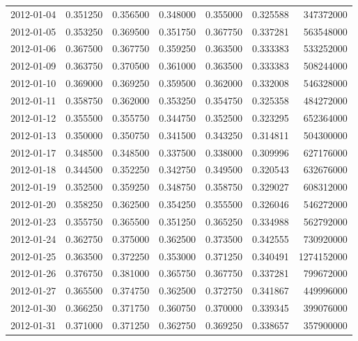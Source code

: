 \begin{tabular}{lrrrrrr}
2012-01-04 &    0.351250 &    0.356500 &    0.348000 &    0.355000 &    0.325588 &   347372000 \\
2012-01-05 &    0.353250 &    0.369500 &    0.351750 &    0.367750 &    0.337281 &   563548000 \\
2012-01-06 &    0.367500 &    0.367750 &    0.359250 &    0.363500 &    0.333383 &   533252000 \\
2012-01-09 &    0.363750 &    0.370500 &    0.361000 &    0.363500 &    0.333383 &   508244000 \\
2012-01-10 &    0.369000 &    0.369250 &    0.359500 &    0.362000 &    0.332008 &   546328000 \\
2012-01-11 &    0.358750 &    0.362000 &    0.353250 &    0.354750 &    0.325358 &   484272000 \\
2012-01-12 &    0.355500 &    0.355750 &    0.344750 &    0.352500 &    0.323295 &   652364000 \\
2012-01-13 &    0.350000 &    0.350750 &    0.341500 &    0.343250 &    0.314811 &   504300000 \\
2012-01-17 &    0.348500 &    0.348500 &    0.337500 &    0.338000 &    0.309996 &   627176000 \\
2012-01-18 &    0.344500 &    0.352250 &    0.342750 &    0.349500 &    0.320543 &   632676000 \\
2012-01-19 &    0.352500 &    0.359250 &    0.348750 &    0.358750 &    0.329027 &   608312000 \\
2012-01-20 &    0.358250 &    0.362500 &    0.354250 &    0.355500 &    0.326046 &   546272000 \\
2012-01-23 &    0.355750 &    0.365500 &    0.351250 &    0.365250 &    0.334988 &   562792000 \\
2012-01-24 &    0.362750 &    0.375000 &    0.362500 &    0.373500 &    0.342555 &   730920000 \\
2012-01-25 &    0.363500 &    0.372250 &    0.353000 &    0.371250 &    0.340491 &  1274152000 \\
2012-01-26 &    0.376750 &    0.381000 &    0.365750 &    0.367750 &    0.337281 &   799672000 \\
2012-01-27 &    0.365500 &    0.374750 &    0.362500 &    0.372750 &    0.341867 &   449996000 \\
2012-01-30 &    0.366250 &    0.371750 &    0.360750 &    0.370000 &    0.339345 &   399076000 \\
2012-01-31 &    0.371000 &    0.371250 &    0.362750 &    0.369250 &    0.338657 &   357900000 \\

\end{tabular}
